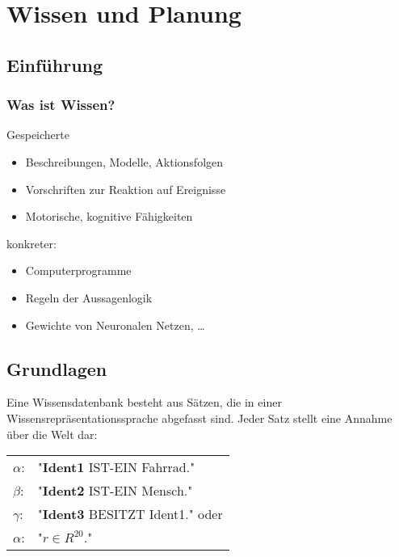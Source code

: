
\section{Wissen und Planung}

\subsection{Einführung}

\subsubsection*{Was ist Wissen?}
Gespeicherte
\begin{itemize}
\item Beschreibungen, Modelle, Aktionsfolgen
\item Vorschriften zur Reaktion auf Ereignisse
\item Motorische, kognitive Fähigkeiten
\end{itemize}
konkreter:
\begin{itemize}
\item Computerprogramme
\item Regeln der Aussagenlogik
\item Gewichte von Neuronalen Netzen, \dots
\end{itemize}

\subsection{Grundlagen}


Eine Wissensdatenbank besteht aus Sätzen, die in einer Wissensrepräsentationssprache abgefasst sind. Jeder Satz stellt eine Annahme über die Welt dar:
\begin{center}
\begin{tabular}{ll}
$\alpha$: & "{}\textbf{Ident1} IST-EIN Fahrrad."{} \\ $\beta$: & "{}\textbf{Ident2} IST-EIN Mensch."{} \\ $\gamma$: & "{}\textbf{Ident3} BESITZT Ident1."{} oder \\ $\alpha$: & "{}$r \in R^{20}$."{}
\end{tabular}
\end{center}


